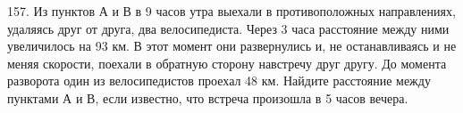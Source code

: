 157. Из пунктов А и В в 9 часов утра выехали в противоположных направлениях, удаляясь друг от друга, два велосипедиста. Через 3 часа расстояние между ними увеличилось на 93 км. В этот момент они развернулись и, не останавливаясь и не меняя скорости, поехали в обратную сторону навстречу друг другу. До момента разворота один из велосипедистов проехал 48 км. Найдите расстояние между пунктами А и В, если известно, что встреча произошла в 5 часов вечера.\\
